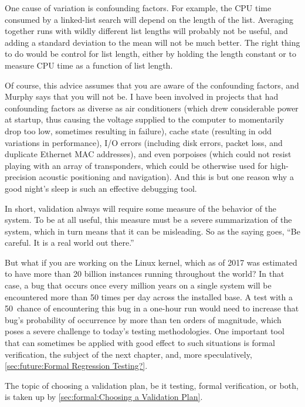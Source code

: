 One cause of variation is confounding factors.
For example, the CPU time consumed by a linked-list search will depend
on the length of the list.
Averaging together runs with wildly different list lengths will
probably not be useful, and adding a standard deviation to the mean
will not be much better.
The right thing to do would be control for list length, either by
holding the length constant or to measure CPU time as a function of
list length.

Of course, this advice assumes that you are aware of the confounding
factors, and Murphy says that you will not be.
I have been involved in projects that had confounding factors as diverse
as air conditioners (which drew considerable power at startup, thus
causing the voltage supplied to the computer to momentarily drop too
low, sometimes resulting in failure), cache state (resulting in odd
variations in performance), I/O errors (including disk errors, packet
loss, and duplicate Ethernet MAC addresses), and even porpoises (which
could not resist playing with an array of transponders, which could be
otherwise used for high-precision acoustic positioning and navigation).
And this is but one reason why a good night's sleep is such an effective
debugging tool.

In short, validation always will require some measure of the behavior of
the system.
To be at all useful, this measure must be a severe summarization of the
system, which in turn means that it can be misleading.
So as the saying goes, ``Be careful.
It is a real world out there.''

But what if you are working on the Linux kernel, which as of 2017 was
estimated to have more than 20 billion instances running throughout
the world?
In that case, a bug that occurs once every million years on a single system
will be encountered more than 50 times per day across the installed base.
A test with a 50\pct\ chance of encountering this bug in a one-hour run
would need to increase that bug's probability of occurrence by more than
ten orders of magnitude, which poses a severe challenge to
today's testing methodologies.
One important tool that can sometimes be applied with good effect to
such situations is formal verification, the subject of the next chapter,
and, more speculatively, \cref{sec:future:Formal Regression Testing?}.

The topic of choosing a validation plan, be it testing, formal
verification, or both, is taken up by
\cref{sec:formal:Choosing a Validation Plan}.

